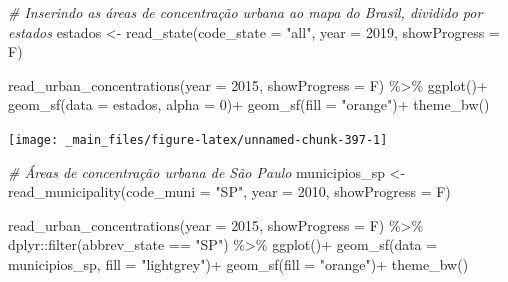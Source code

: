 \documentclass[
  brazilian,
]{book}
\newenvironment{Shaded}{\begin{snugshade}}{\end{snugshade}}
\newcommand{\AttributeTok}[1]{\textcolor[rgb]{0.77,0.63,0.00}{#1}}
\newcommand{\CommentTok}[1]{\textcolor[rgb]{0.56,0.35,0.01}{\textit{#1}}}
\newcommand{\DecValTok}[1]{\textcolor[rgb]{0.00,0.00,0.81}{#1}}
\newcommand{\FunctionTok}[1]{\textcolor[rgb]{0.00,0.00,0.00}{#1}}
\newcommand{\NormalTok}[1]{#1}
\newcommand{\OtherTok}[1]{\textcolor[rgb]{0.56,0.35,0.01}{#1}}
\newcommand{\SpecialCharTok}[1]{\textcolor[rgb]{0.00,0.00,0.00}{#1}}
\newcommand{\StringTok}[1]{\textcolor[rgb]{0.31,0.60,0.02}{#1}}
\begin{document}
\begin{Shaded}
\begin{Highlighting}[]
\CommentTok{\# Inserindo as áreas de concentração urbana ao mapa do Brasil, dividido por estados}
\NormalTok{estados }\OtherTok{\textless{}{-}} \FunctionTok{read\_state}\NormalTok{(}\AttributeTok{code\_state =} \StringTok{"all"}\NormalTok{,}
                      \AttributeTok{year =} \DecValTok{2019}\NormalTok{,}
                      \AttributeTok{showProgress =}\NormalTok{ F)}


\FunctionTok{read\_urban\_concentrations}\NormalTok{(}\AttributeTok{year =} \DecValTok{2015}\NormalTok{,}
                          \AttributeTok{showProgress =}\NormalTok{ F) }\SpecialCharTok{\%\textgreater{}\%} 
  \FunctionTok{ggplot}\NormalTok{()}\SpecialCharTok{+}
  \FunctionTok{geom\_sf}\NormalTok{(}\AttributeTok{data =}\NormalTok{ estados, }\AttributeTok{alpha =} \DecValTok{0}\NormalTok{)}\SpecialCharTok{+}
  \FunctionTok{geom\_sf}\NormalTok{(}\AttributeTok{fill =} \StringTok{"orange"}\NormalTok{)}\SpecialCharTok{+}
  \FunctionTok{theme\_bw}\NormalTok{()}
\end{Highlighting}
\end{Shaded}

\begin{center}\texttt{[image: \_main\_files/figure-latex/unnamed-chunk-397-1]} \end{center}

\begin{Shaded}
\begin{Highlighting}[]
\CommentTok{\# Áreas de concentração urbana de São Paulo}
\NormalTok{municipios\_sp }\OtherTok{\textless{}{-}} \FunctionTok{read\_municipality}\NormalTok{(}\AttributeTok{code\_muni =} \StringTok{"SP"}\NormalTok{,}
                                   \AttributeTok{year =} \DecValTok{2010}\NormalTok{,}
                                   \AttributeTok{showProgress =}\NormalTok{ F)}

\FunctionTok{read\_urban\_concentrations}\NormalTok{(}\AttributeTok{year =} \DecValTok{2015}\NormalTok{,}
                          \AttributeTok{showProgress =}\NormalTok{ F) }\SpecialCharTok{\%\textgreater{}\%} 
\NormalTok{  dplyr}\SpecialCharTok{::}\FunctionTok{filter}\NormalTok{(abbrev\_state }\SpecialCharTok{==} \StringTok{"SP"}\NormalTok{) }\SpecialCharTok{\%\textgreater{}\%} 
  \FunctionTok{ggplot}\NormalTok{()}\SpecialCharTok{+}
  \FunctionTok{geom\_sf}\NormalTok{(}\AttributeTok{data =}\NormalTok{ municipios\_sp, }\AttributeTok{fill =} \StringTok{"lightgrey"}\NormalTok{)}\SpecialCharTok{+}
  \FunctionTok{geom\_sf}\NormalTok{(}\AttributeTok{fill =} \StringTok{"orange"}\NormalTok{)}\SpecialCharTok{+}
  \FunctionTok{theme\_bw}\NormalTok{()}
\end{Highlighting}
\end{Shaded}
\end{document}
